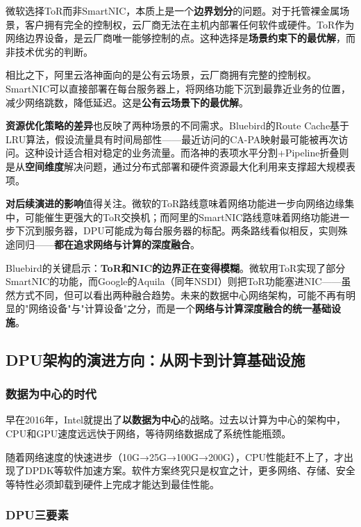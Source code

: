 微软选择ToR而非SmartNIC，本质上是一个\textbf{边界划分}的问题。对于托管裸金属场景，客户拥有完全的控制权，云厂商无法在主机内部署任何软件或硬件。ToR作为网络边界设备，是云厂商唯一能够控制的点。这种选择是\textbf{场景约束下的最优解}，而非技术优劣的判断。

相比之下，阿里云洛神面向的是公有云场景，云厂商拥有完整的控制权。SmartNIC可以直接部署在每台服务器上，将网络功能下沉到最靠近业务的位置，减少网络跳数，降低延迟。这是\textbf{公有云场景下的最优解}。

\textbf{资源优化策略的差异}也反映了两种场景的不同需求。Bluebird的Route Cache基于LRU算法，假设流量具有时间局部性——最近访问的CA-PA映射最可能被再次访问。这种设计适合相对稳定的业务流量。而洛神的表项水平分割+Pipeline折叠则是从\textbf{空间维度}解决问题，通过分布式部署和硬件资源最大化利用来支撑超大规模表项。

\textbf{对后续演进的影响}值得关注。微软的ToR路线意味着网络功能进一步向网络边缘集中，可能催生更强大的ToR交换机；而阿里的SmartNIC路线意味着网络功能进一步下沉到服务器，DPU可能成为每台服务器的标配。两条路线看似相反，实则殊途同归——\textbf{都在追求网络与计算的深度融合}。

Bluebird的关键启示：\textbf{ToR和NIC的边界正在变得模糊}。微软用ToR实现了部分SmartNIC的功能，而Google的Aquila（同年NSDI）则把ToR功能塞进NIC——虽然方式不同，但可以看出两种融合趋势。未来的数据中心网络架构，可能不再有明显的"网络设备"与"计算设备"之分，而是一个\textbf{网络与计算深度融合的统一基础设施}。

\subsection{DPU架构的演进方向：从网卡到计算基础设施}

\subsubsection{数据为中心的时代}

早在2016年，Intel就提出了\textbf{以数据为中心}的战略。过去以计算为中心的架构中，CPU和GPU速度远远快于网络，等待网络数据成了系统性能瓶颈。

随着网络速度的快速进步（10G→25G→100G→200G），CPU性能赶不上了，才出现了DPDK等软件加速方案。软件方案终究只是权宜之计，更多网络、存储、安全等特性必须卸载到硬件上完成才能达到最佳性能。

\subsubsection{DPU三要素}


